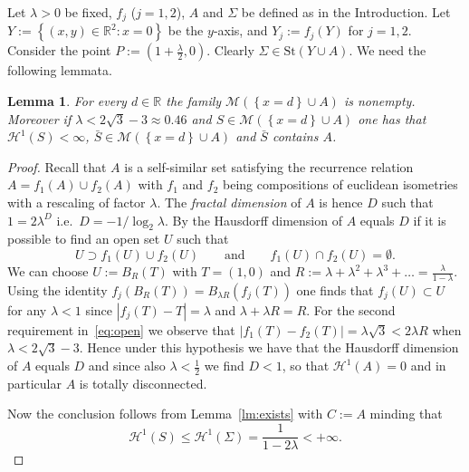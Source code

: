 \documentclass{amsart}
\newcommand{\RR}{\mathbb R}
\renewcommand{\H}{\mathcal H}
\newcommand{\abs}[1]{\left\vert #1 \right\vert}
\newcommand{\ENCLOSE}[1]{\left\{#1\right\}}
\newcommand{\St}{\mathrm{St}}
\newcommand{\M}{\mathcal{M}}
\renewcommand{\H}{\mathcal{H}}
\newtheorem{lemma}[theorem]{Lemma}
\theoremstyle{definition}
\theoremstyle{remark}
\begin{document}
Let $\lambda>0$ be fixed,
$f_j$ ($j=1,2$), 
$A$ and $\Sigma$ be defined as in the Introduction.
Let $Y:=\ENCLOSE{(x,y)\in\RR^2\colon x=0}$ be the $y$-axis,
and $Y_j := f_j(Y)$ for $j=1,2$.
Consider the point $P:=(1+\frac\lambda 2,0)$.
Clearly $\Sigma\in \St(Y\cup A)$.
We need the following lemmata.

\begin{lemma}\label{lm:existsA} 
  For every $d\in \RR$ the family $\M(\ENCLOSE{x=d}\cup A)$ is nonempty.
  Moreover if $\lambda < 2\sqrt 3- 3 \approx 0.46$ 
  and $S \in \M(\ENCLOSE{x=d}\cup A)$ 
  one has that $\H^1(S)<\infty$,
  $\bar S\in \M(\ENCLOSE{x=d}\cup A)$ and
  $\bar S$ contains $A$.
\end{lemma}
\begin{proof}
  Recall that $A$ is a self-similar set 
  satisfying the recurrence relation
  $A = f_1(A) \cup f_2(A)$
  with $f_1$ and $f_2$ being compositions of euclidean isometries 
  with a rescaling of factor $\lambda$. 
  The \emph{fractal dimension} of $A$ is hence 
  $D$ such that $1 = 2 \lambda^D$ i.e.\ $D=-1/\log_2\lambda$.
  By \cite[theorem 5.3(1)]{Hut81} the Hausdorff dimension 
  of $A$ equals $D$ if it is possible to find an open set $U$ 
  such that 
  \begin{equation}\label{eq:open}
    U \supset f_1(U) \cup f_2(U) 
    \qquad\text{and}\qquad 
    f_1(U)\cap f_2(U) = \emptyset.
  \end{equation}
  We can choose $U:=B_R(T)$ with $T=(1,0)$ and 
  $R:=\lambda+\lambda^2+\lambda^3+\dots = \frac{\lambda}{1-\lambda}$.
  Using the identity $f_j(B_R(T)) = B_{\lambda R}(f_j(T))$
  one finds that $f_j(U)\subset U$ for any $\lambda<1$ since
  $\abs{f_j(T)-T} = \lambda$ and $\lambda + \lambda R = R$.
  For the second requirement in~\eqref{eq:open} we observe 
  that $\abs{f_1(T)-f_2(T)} = \lambda\sqrt 3 < 2\lambda R$
  when $\lambda < 2\sqrt 3 - 3$.
  Hence under this hypothesis we have that the Hausdorff 
  dimension of $A$ equals $D$ and since 
  also $\lambda < \frac 1 2$ we find $D<1$, so that 
  $\H^1(A) = 0$ and in particular $A$ is totally disconnected.
  
  Now the conclusion follows from Lemma~\ref{lm:exists} with $C:=A$ 
  minding that 
  \[
    \H^1(S)\le \H^1(\Sigma) = \frac{1}{1-2\lambda}<+\infty.
  \]
\end{proof}
\end{document}
